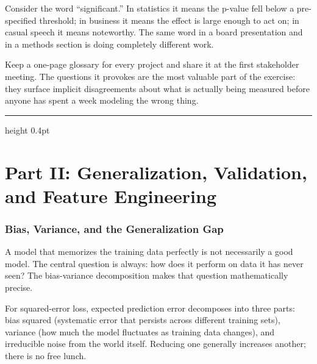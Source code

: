 \documentclass[12pt,a4paper]{article}
\begin{document}
\begin{analogy}
Consider the word ``significant.'' In statistics it means the p-value fell
below a pre-specified threshold; in business it means the effect is large
enough to act on; in casual speech it means noteworthy. The same word in
a board presentation and in a methods section is doing completely different
work.
\end{analogy}

\begin{mentalmodel}
Keep a one-page glossary for every project and share it at the first
stakeholder meeting. The questions it provokes are the most valuable
part of the exercise: they surface implicit disagreements about what is
actually being measured before anyone has spent a week modeling the wrong
thing.
\end{mentalmodel}

\vspace{10pt}\hrule height 0.4pt\vspace{14pt}

\part*{Part II: Generalization, Validation, and Feature Engineering}

\section*{Bias, Variance, and the Generalization Gap}

A model that memorizes the training data perfectly is not necessarily a
good model. The central question is always: how does it perform on data
it has never seen? The bias-variance decomposition makes that question
mathematically precise.

\begin{concept}
For squared-error loss, expected prediction error decomposes into three
parts: bias squared (systematic error that persists across different
training sets), variance (how much the model fluctuates as training data
changes), and irreducible noise from the world itself. Reducing one
generally increases another; there is no free lunch.
\end{concept}
\end{document}
